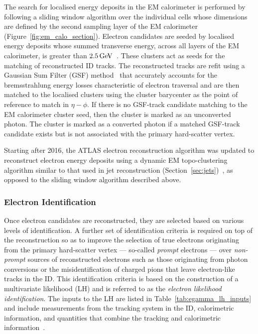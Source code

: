 The search for localised energy deposits in the EM calorimeter is performed
by following a sliding window algorithm over the individual cells whose dimensions are
defined by the second sampling layer of the EM calorimeter (Figure~\ref{fig:em_calo_section}).
Electron candidates are seeded by localised energy deposits whose summed transverse energy,
across all layers of the EM calorimeter, is greater than $2.5\,\text{Ge\kern -0.1em V}$~\cite{Aaboud:2657964}.
These clusters act as seeds for the matching of reconstructed ID tracks.
The reconstructed tracks are refit using a Gaussian Sum Filter (GSF) method~\cite{ATLAS-CONF-2012-047} 
that accurately accounts for the bremsstrahlung energy losses characteristic of
electron traversal and are then matched to the localised clusters using
the cluster barycenter as the point of reference to match in $\eta-\phi$.
If there is no GSF-track candidate matching to the EM calorimeter cluster seed, then
the cluster is marked as an unconverted photon. The cluster is marked as a
converted photon if a matched GSF-track candidate exists but is not associated
with the primary hard-scatter vertex.

Starting after 2016, the ATLAS electron reconstruction algorithm was updated to reconstruct
electron energy deposits using a dynamic EM topo-clustering algorithm similar to that used
in jet reconstruction (Section~\ref{sec:jets})~\cite{Aad:2019tso}, as opposed to the sliding window
algorithm described above.


\subsubsection{Electron Identification}
\label{sec:electron_id}

Once electron candidates are reconstructed, they are selected based on various
levels of identification.
A further set of identification criteria is required on top of the reconstruction
so as to improve the selection of true electrons originating from the primary hard-scatter
vertex --- so-called \textit{prompt} electrons --- over \textit{non-prompt} sources
of reconstructed electrons such as those originating from photon conversions or the misidentification
of charged pions that leave electron-like tracks in the ID.
This identification criteria is based on the construction of a multivariate likelihood (LH) and
is referred to as the \textit{electron likelihood identification}.
The inputs to the LH are listed in Table~\ref{tab:egamma_lh_inputs} and include measurements from the tracking system in the ID,
calorimetric information, and quantities that combine the tracking and calorimetric information~\cite{Aad:2019tso}.


